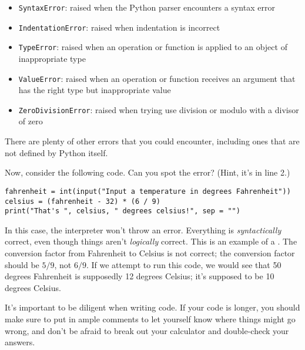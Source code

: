 \begin{itemize}
    \item \verb|SyntaxError|: raised when the Python parser encounters a syntax error
    \item \verb|IndentationError|: raised when indentation is incorrect
    \item \verb|TypeError|: raised when an operation or function is applied to an object of inappropriate type
    \item \verb|ValueError|: raised when an operation or function receives an argument that has the right type but inappropriate value
    \item \verb|ZeroDivisionError|: raised when trying use division or modulo with a divisor of zero
\end{itemize}
There are plenty of other errors that you could encounter, including ones that are not defined by Python itself.\par
Now, consider the following code. Can you spot the error? (Hint, it's in line 2.)
\begin{lstlisting}[style=pippython]
fahrenheit = int(input("Input a temperature in degrees Fahrenheit"))
celsius = (fahrenheit - 32) * (6 / 9)
print("That's ", celsius, " degrees celsius!", sep = "")
\end{lstlisting}
In this case, the interpreter won't throw an error. Everything is \textit{syntactically} correct, even though things aren't \textit{logically} correct. This is an example of a . The conversion factor from Fahrenheit to Celsius is not correct; the conversion factor should be $5/9$, not $6/9$. If we attempt to run this code, we would see that 50 degrees Fahrenheit is supposedly 12 degrees Celsius; it's supposed to be 10 degrees Celsius.\par
It's important to be diligent when writing code. If your code is longer, you should make sure to put in ample comments to let yourself know where things might go wrong, and don't be afraid to break out your calculator and double-check your answers.\par
